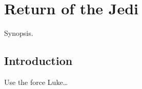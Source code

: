 \chapter{Return of the Jedi} \label{chapter:return-of-the-jedi}


\begin{synopsis}

Synopsis.

\end{synopsis}

\section{Introduction}\label{introduction}

Use the force Luke\ldots{}
